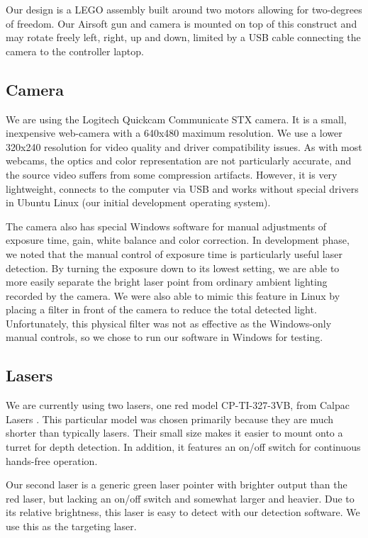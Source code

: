 \documentclass[10pt,twocolumn,letterpaper]{article}
\begin{document}
Our design is a LEGO assembly built around two motors allowing for two-degrees of freedom. Our Airsoft gun and camera is mounted on top of this construct and may rotate freely left, right, up and down, limited by a USB cable connecting the camera to the controller laptop.
 
\subsection{Camera}

We are using the Logitech Quickcam Communicate STX \cite{logi} camera.  It is a small, inexpensive web-camera with a 640x480 maximum resolution.  We use a lower 320x240 resolution for video quality and driver compatibility issues.  As with most webcams, the optics and color representation are not particularly accurate, and the source video suffers from some compression artifacts.  However, it is very lightweight, connects to the computer via USB and works without special drivers in Ubuntu Linux (our initial development operating system).

The camera also has special Windows software for manual adjustments of exposure time, gain, white balance and color correction.  In development phase, we noted that the manual control of exposure time is particularly useful laser detection.  By turning the exposure down to its lowest setting, we are able to more easily separate the bright laser point from ordinary ambient lighting recorded by the camera.  We were also able to mimic this feature in Linux by placing a filter in front of the camera to reduce the total detected light.  Unfortunately, this physical filter was not as effective as the Windows-only manual controls, so we chose to run our software in Windows for testing.

\subsection{Lasers}

We are currently using two lasers, one red model CP-TI-327-3VB, from Calpac Lasers \cite{calpac}.  This particular model was chosen primarily because they are much shorter than typically lasers.  Their small size makes it easier to mount onto a turret for depth detection.  In addition, it features an on/off switch for continuous hands-free operation.

Our second laser is a generic green laser pointer with brighter output than the red laser, but lacking an on/off switch and somewhat larger and heavier.  Due to its relative brightness, this laser is easy to detect with our detection software.  We use this as the targeting laser.
\end{document}
